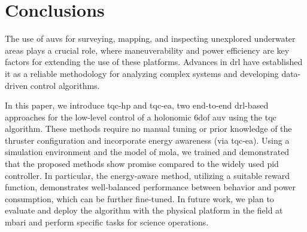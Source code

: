 \section{Conclusions}
\label{sec:conclusions}

The use of \acp{auv} for surveying, mapping, and inspecting unexplored underwater areas plays a crucial role, where maneuverability and power efficiency are key factors for extending the use of these platforms. Advances in \ac{drl} have established it as a reliable methodology for analyzing complex systems and developing data-driven control algorithms.

In this paper, we introduce \ac{tqc-hp} and \ac{tqc-ea}, two end-to-end \ac{drl}-based approaches for the low-level control of a holonomic \ac{6dof} \ac{auv} using the \ac{tqc} algorithm. These methods require no manual tuning or prior knowledge of the thruster configuration and incorporate energy awareness (via \ac{tqc-ea}). Using a simulation environment and the model of \ac{mola}, we trained and demonstrated that the proposed methods show promise compared to the widely used \ac{pid} controller. In particular, the energy-aware method, utilizing a suitable reward function, demonstrates well-balanced performance between behavior and power consumption, which can be further fine-tuned. In future work, we plan to evaluate and deploy the algorithm with the physical platform in the field at \ac{mbari} and perform specific tasks for science operations. 
